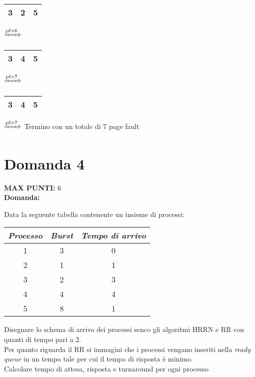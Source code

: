 \documentclass{article}
\begin{document}
\begin{itemize}
\begin{tabular}{|c|c|c|}
                3 & 2 & 5\\
                \hline
            \end{tabular}
            $\xRightarrow{\text{pf}=6}$
            \begin{tabular}{|c|c|c|}
                \hline
                3 & 4 & 5\\
                \hline
            \end{tabular}
            $\xRightarrow{\text{pf}=7}$
            \begin{tabular}{|c|c|c|}
                \hline
                3 & 4 & 5\\
                \hline
            \end{tabular}
            $\xRightarrow{\text{pf}=7}$
            Termino con un totale di 7 page fault
    \end{itemize}
    \section*{Domanda 4}
    \textbf{MAX PUNTI:} 6\\
    \textbf{Domanda:}


    Data la seguente tabella contenente un insieme di processi:
    \begin{center}
        \begin{tabular}{|c|c|c|}
            \hline
            \emph{Processo} & \emph{Burst} & \emph{Tempo di arrivo}\\
            \hline
            1 & 3 & 0\\
            \hline
            2 & 1 & 1\\
            \hline
            3 & 2 & 3\\
            \hline
            4 & 4 & 4\\
            \hline
            5 & 8 & 1\\
            \hline
        \end{tabular}
    \end{center}
    Disegnare lo schema di arrivo dei processi senco gli algoritmi HRRN e RR con quanti di tempo pari a 2.\\
    Per quanto riguarda il RR si immagini che i processi vengano inseriti nella \emph{ready queue} in un tempo tale per cui il tempo di risposta è minimo.\\
    Calcolare tempo di attesa, risposta e turnaround per ogni processo
\end{document}
